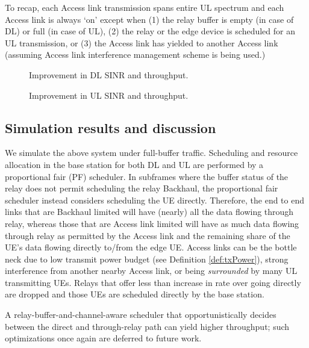 \documentclass[journal]{IEEEtran}
\begin{document}
To recap, each Access link transmission spans entire UL spectrum and each Access link is always `on' except when (1) the relay buffer is empty (in case of DL) or full (in case of UL), (2) the relay or the edge device is scheduled for an UL transmission, or (3) the Access link has yielded to another Access link (assuming Access link interference management scheme is being used.)

\begin{figure*}
\centering
{}
\caption{Improvement in DL SINR and throughput.}
\label{fig:dlwoIM}
\vspace{-0.1in}
\end{figure*}
\begin{figure*}
\centering
{}
\caption{Improvement in UL SINR and throughput.}
\label{fig:ulwoIM}
\vspace{-0.1in}
\end{figure*}

\subsection{Simulation results and discussion}
\label{sec:simResults}
We simulate the above system under full-buffer traffic. Scheduling and resource allocation in the base station for both DL and UL are performed by a proportional fair (PF) scheduler.  In subframes where the buffer status of the relay does not permit scheduling the relay Backhaul, the proportional fair scheduler instead considers scheduling the UE directly.  Therefore, the end to end links that are Backhaul limited will have (nearly) all the data flowing through relay, whereas those that are Access link limited will have as much data flowing through relay as permitted by the Access link and the remaining share of the UE's data flowing directly to/from the edge UE.  Access links can be the bottle neck due to low transmit power budget (see Definition \ref{def:txPower}), strong interference from another nearby Access link, or being {\em surrounded} by many UL transmitting UEs. Relays that offer less than  increase in rate over going directly are dropped and those UEs are scheduled directly by the base station.

A relay-buffer-and-channel-aware scheduler that opportunistically decides between the direct and through-relay path can yield higher throughput; such optimizations once again are deferred to future work.
\end{document}
